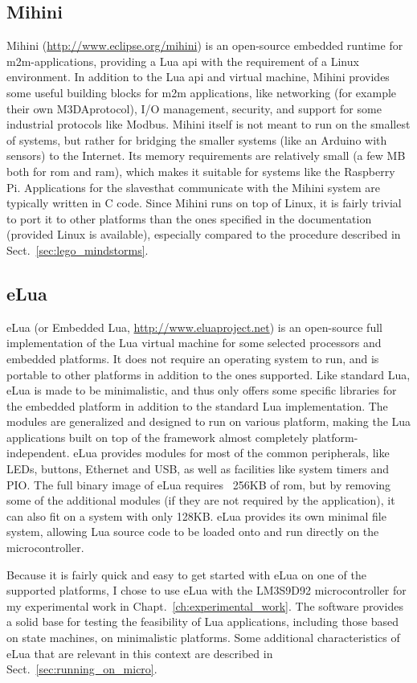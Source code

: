 \subsection{Mihini}
\label{sec:mihini}
Mihini (\url{http://www.eclipse.org/mihini}) is an open-source embedded runtime for \gls{m2m}-applications, providing a Lua \gls{api} with the requirement of a Linux environment. In addition to the Lua \gls{api} and virtual machine, Mihini provides some useful building blocks for \gls{m2m} applications, like networking (for example their own \guillemotleft M3DA\guillemotright  protocol), I/O management, security, and support for some industrial protocols like Modbus. Mihini itself is not meant to run on the smallest of systems, but rather for bridging the smaller systems (like an Arduino with sensors) to the Internet. Its memory requirements are relatively small (a few MB both for \gls{rom} and \gls{ram}), which makes it suitable for systems like the Raspberry Pi. Applications for the \guillemotleft slaves\guillemotright  that communicate with the Mihini system are typically written in C code. Since Mihini runs on top of Linux, it is fairly trivial to port it to other platforms than the ones specified in the documentation (provided Linux is available), especially compared to the procedure described in Sect.~\ref{sec:lego_mindstorms}.

\subsection{eLua}
\label{sec:elua}
eLua (or Embedded Lua, \url{http://www.eluaproject.net}) is an open-source full implementation of the Lua virtual machine for some selected processors and embedded platforms. It does not require an operating system to run, and is portable to other platforms in addition to the ones supported. Like standard Lua, eLua is made to be minimalistic, and thus only offers some specific libraries for the embedded platform in addition to the standard Lua implementation. The modules are generalized and designed to run on various platform, making the Lua applications built on top of the framework almost completely platform-independent. eLua provides modules for most of the common peripherals, like LEDs, buttons, Ethernet and USB, as well as facilities like system timers and PIO. The full binary image of eLua requires ~256KB of \gls{rom}, but by removing some of the additional modules (if they are not required by the application), it can also fit on a system with only 128KB. eLua provides its own minimal file system, allowing Lua source code to be loaded onto and run directly on the microcontroller.

Because it is fairly quick and easy to get started with eLua on one of the supported platforms, I chose to use eLua with the LM3S9D92 microcontroller for my experimental work in Chapt.~\ref{ch:experimental_work}. The software provides a solid base for testing the feasibility of Lua applications, including those based on state machines, on minimalistic platforms. Some additional characteristics of eLua that are relevant in this context are described in Sect.~\ref{sec:running_on_micro}.